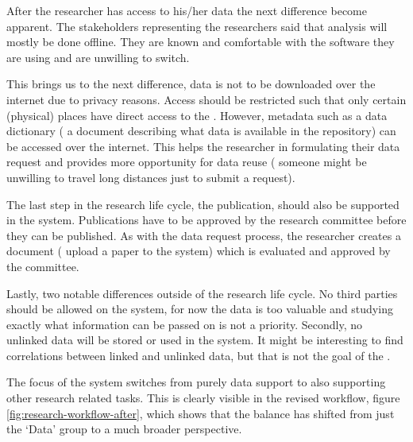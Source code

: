 After the researcher has access to his/her data the next difference become apparent.
The stakeholders representing the researchers said that analysis will mostly be done offline.
They are known and comfortable with the software they are using and are unwilling to switch.

This brings us to the next difference, data is not to be downloaded over the internet due to privacy reasons. 
Access should be restricted such that only certain (physical) places have direct access to the \projectdata{}.
However, metadata such as a data dictionary (\ie{} a document describing what data is available in the repository) can be accessed over the internet.
This helps the researcher in formulating their data request and provides more opportunity for data reuse (\eg{} someone might be unwilling to travel long distances just to submit a request).

The last step in the research life cycle, the publication, should also be supported in the system.
Publications have to be approved by the research committee before they can be published.
As with the data request process, the researcher creates a document (\ie{} upload a paper to the system) which is evaluated and approved by the committee.

Lastly, two notable differences outside of the research life cycle.
No third parties should be allowed on the system, for now the data is too valuable and studying exactly what information can be passed on is not a priority.
Secondly, no unlinked data will be stored or used in the system.
It might be interesting to find correlations between linked and unlinked data, but that is not the goal of the \project{}.

The focus of the system switches from purely data support to also supporting other research related tasks.
This is clearly visible in the revised workflow, figure \ref{fig:research-workflow-after}, which shows that the balance has shifted from just the `Data' group to a much broader perspective.